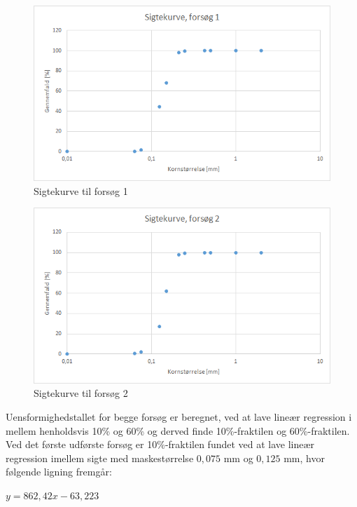 \begin{figure}[htbp]
		\includegraphics[width=1.0\textwidth]{billeder/sigtekurve1.png}
		\caption{Sigtekurve til forsøg 1}
		\label{fig:sigtekurve1}
\end{figure}

\begin{figure}[htbp]
		\centering
		\includegraphics[width=1.0\textwidth]{billeder/sigtekurve2.png}
		\caption{Sigtekurve til forsøg 2}
		\label{fig:sigtekurve2}
\end{figure}

Uensformighedstallet for begge forsøg er beregnet, ved at lave lineær regression i mellem henholdsvis 10\% og 60\% og derved finde 10\%-fraktilen og 60\%-fraktilen.
\newline
\newline
Ved det første udførste forsøg er 10\%-fraktilen fundet ved at lave lineær regression imellem sigte med maskestørrelse $0,\!075$ mm og $0,\!125$ mm, hvor følgende ligning fremgår: 

\begin{center}
	$y = 862,\!42x - 63,\!223$
\end{center}

